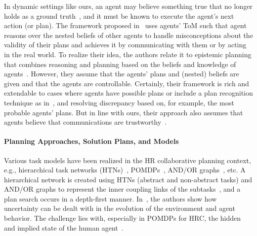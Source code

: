 \documentclass[letterpaper]{article} %
\begin{document}
In dynamic settings like ours, an agent may believe something true that no longer holds as a ground truth~\cite{DissingB20}, and it must be known to execute the agent's next action (or plan).
The framework proposed in~\cite{ShvoKM22} uses agents' ToM such that agent reasons over the nested beliefs of other agents to handle misconceptions about the validity of their plans and achieves it by communicating with them or by acting in the real world. To realize their idea, the authors relate it to epistemic planning that combines reasoning and planning based on the beliefs and knowledge of agents~\cite{petrick2002knowledge,BolanderA11}.
However, they assume that the agents' plans and (nested) beliefs are given and that the agents are controllable. Certainly, their framework is rich and extendable to cases where agents have possible plans or include a plan recognition technique as in~\cite{CirilloKS09}, and resolving discrepancy based on, for example, the most probable agents' plans.
But in line with ours, their approach also assumes that agents believe that communications are trustworthy~\cite{fabiano2021multi}.



\paragraph{Planning Approaches, Solution Plans, and Models}
Various task models have been realized in the HR collaborative planning context, e.g., hierarchical task networks (HTNs)~\cite{lallement2018hatp,roncone2017transparent}, POMDPs~\cite{UnhelkarLS19,roncone2017transparent,UnhelkarLS20}, AND/OR graphs~\cite{DarvishSMC21}, etc.
A hierarchical network is created using HTNs (abstract and non-abstract tasks) and AND/OR graphs to represent the inner coupling links of the subtasks~\cite{GombolayJSSS16},
and a plan search occurs in a depth-first manner. In~\cite{HorgerKE19}, the authors show how uncertainty can be dealt with in the evolution of the environment and agent behavior. The challenge lies with, especially in POMDPs for HRC, the hidden and implied state of the human agent~\cite{UnhelkarLS20}.
\end{document}

